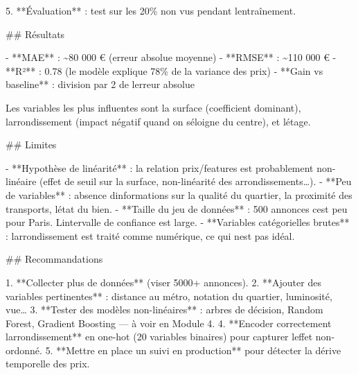 \documentclass[
  french,
  11pt,
  a4paper,
]{scrbook}
\newenvironment{Shaded}{}{}
\newcommand{\FunctionTok}[1]{\textcolor[rgb]{0.44,0.26,0.76}{#1}}
\newcommand{\NormalTok}[1]{\textcolor[rgb]{0.14,0.16,0.18}{#1}}
\newcommand{\SpecialStringTok}[1]{\textcolor[rgb]{0.01,0.18,0.38}{#1}}
\begin{document}
\begin{tcolorbox}
\begin{Shaded}
\begin{Highlighting}[]
\SpecialStringTok{5. }\NormalTok{**Évaluation** : test sur les 20\% non vus pendant l\textquotesingle{}entraînement.}

\FunctionTok{\#\# Résultats}

\SpecialStringTok{{-} }\NormalTok{**MAE** : \textasciitilde{}80 000 € (erreur absolue moyenne)}
\SpecialStringTok{{-} }\NormalTok{**RMSE** : \textasciitilde{}110 000 €}
\SpecialStringTok{{-} }\NormalTok{**R²** : 0.78 (le modèle explique 78\% de la variance des prix)}
\SpecialStringTok{{-} }\NormalTok{**Gain vs baseline** : division par 2 de l\textquotesingle{}erreur absolue}

\NormalTok{Les variables les plus influentes sont la surface (coefficient }
\NormalTok{dominant), l\textquotesingle{}arrondissement (impact négatif quand on s\textquotesingle{}éloigne }
\NormalTok{du centre), et l\textquotesingle{}étage.}

\FunctionTok{\#\# Limites}

\SpecialStringTok{{-} }\NormalTok{**Hypothèse de linéarité** : la relation prix/features est }
\NormalTok{probablement non{-}linéaire (effet de seuil sur la surface, }
\NormalTok{non{-}linéarité des arrondissements…).}
\SpecialStringTok{{-} }\NormalTok{**Peu de variables** : absence d\textquotesingle{}informations sur la qualité du }
\NormalTok{quartier, la proximité des transports, l\textquotesingle{}état du bien.}
\SpecialStringTok{{-} }\NormalTok{**Taille du jeu de données** : 500 annonces c\textquotesingle{}est peu pour Paris. }
\NormalTok{L\textquotesingle{}intervalle de confiance est large.}
\SpecialStringTok{{-} }\NormalTok{**Variables catégorielles brutes** : l\textquotesingle{}arrondissement est traité }
\NormalTok{comme numérique, ce qui n\textquotesingle{}est pas idéal.}

\FunctionTok{\#\# Recommandations}

\SpecialStringTok{1. }\NormalTok{**Collecter plus de données** (viser 5000+ annonces).}
\SpecialStringTok{2. }\NormalTok{**Ajouter des variables pertinentes** : distance au métro, }
\NormalTok{notation du quartier, luminosité, vue…}
\SpecialStringTok{3. }\NormalTok{**Tester des modèles non{-}linéaires** : arbres de décision, }
\NormalTok{Random Forest, Gradient Boosting — à voir en Module 4.}
\SpecialStringTok{4. }\NormalTok{**Encoder correctement l\textquotesingle{}arrondissement** en one{-}hot }
\NormalTok{(20 variables binaires) pour capturer l\textquotesingle{}effet non{-}ordonné.}
\SpecialStringTok{5. }\NormalTok{**Mettre en place un suivi en production** pour détecter la }
\NormalTok{dérive temporelle des prix.}


\end{Highlighting}
\end{Shaded}
\end{tcolorbox}
\end{document}
